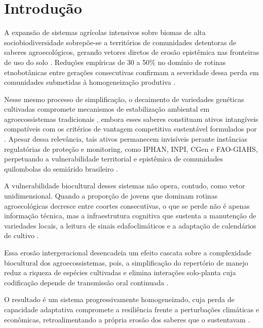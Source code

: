 \newpage

\section{Introdução}
\label{sec:intro_cap2}

A expansão de sistemas agrícolas intensivos sobre biomas de alta sociobiodiversidade sobrepõe-se a territórios de comunidades detentoras de saberes agroecológicos, gerando vetores diretos de erosão epistêmica nas fronteiras de uso do solo \cite{Altieri2004}. Reduções empíricas de 30 a 50\% no domínio de rotinas etnobotânicas entre gerações consecutivas confirmam a severidade dessa perda em comunidades submetidas à homogeneização produtiva \cite{ReyesGarcia2013}. 

Nesse mesmo processo de simplificação, o decaimento de variedades genéticas cultivadas compromete mecanismos de estabilização ambiental em agroecossistemas tradicionais \cite{Jarvis2008}, embora esses saberes constituam ativos intangíveis compatíveis com os critérios de vantagem competitiva sustentável formulados por . Apesar dessa relevância, tais ativos permanecem invisíveis perante instâncias regulatórias de proteção e monitoring, como IPHAN, INPI, CGen e FAO-GIAHS, perpetuando a vulnerabilidade territorial e epistêmica de comunidades quilombolas do semiárido brasileiro \cite{Santilli2009,Cunha2009,Goncalves2022}.

A vulnerabilidade biocultural desses sistemas não opera, contudo, como vetor unidimensional. Quando a proporção de jovens que dominam rotinas agroecológicas decresce entre coortes consecutivas, o que se perde não é apenas informação técnica, mas a infraestrutura cognitiva que sustenta a manutenção de variedades locais, a leitura de sinais edafoclimáticos e a adaptação de calendários de cultivo \cite{ReyesGarcia2013,GomezBaggethun2013}.

Essa erosão intergeracional desencadeia um efeito cascata sobre a complexidade biocultural dos agroecossistemas, pois, a simplificação do repertório de manejo reduz a riqueza de espécies cultivadas e elimina interações solo-planta cuja codificação depende de transmissão oral continuada \cite{Brush2004,Jarvis2008,Bastos2022}. 

O resultado é um sistema progressivamente homogeneizado, cuja perda de capacidade adaptativa compromete a resiliência frente a perturbações climáticas e econômicas, retroalimentando a própria erosão dos saberes que o sustentavam \cite{Tran2025,Aniah2019}.

